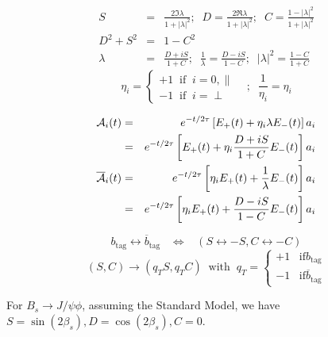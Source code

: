 \documentclass[a4paper,9pt,twoside]{article}
\begin{document}
\begin{eqnarray}
   S &=& \frac{2 \Im \lambda}{1+|\lambda|^2};\;\; D = \frac{2 \Re \lambda}{1+|\lambda|^2};\;\; C = \frac{1-|\lambda|^2 }{1+|\lambda|^2}\\
   D^2+S^2 & = & 1 - C^2 \\
   \lambda & = & \frac{D+iS}{1+C};\;\; \frac{1}{\lambda}  =  \frac{D-iS}{1-C};\;\; |\lambda|^2 = \frac{ 1-C }{ 1+C }
\end{eqnarray}
\begin{equation}
  \eta_i = \left\{ \begin{array}{l} +1 \;\; \mathrm{if}\;\; i=0,\parallel  \\ -1\;\; \mathrm{if}\;\; i=\perp \end{array} \right. \;\;\;;\;\; \frac{1}{\eta_i}=\eta_i
\end{equation}

\begin{eqnarray}
   {\cal A}_i(t)            &=& e^{-t/2\tau} \left[ E_+(t) + \eta_i \lambda E_-(t)  \right] a_i  \\
                            &=&     e^{-t/2\tau} \left[ E_+(t) +\eta_i \frac{D+iS}{1+C} E_-(t)  \right] a_i  \\
   {\overline{\cal A}}_i(t) &=& e^{-t/2\tau} \left[ \eta_i E_+(t) + \frac{1}{\lambda} E_-(t)  \right] a_i    \\
                            &=&     e^{-t/2\tau} \left[\eta_i E_+(t) + \frac{D-iS}{1-C} E_-(t)  \right] a_i   
\end{eqnarray}

\begin{equation}
b_\mathrm{tag} \leftrightarrow \overline{b}_\mathrm{tag} \;\;\;\Leftrightarrow\;\;\;  ( S \leftrightarrow -S, C\leftrightarrow -C ) 
\end{equation}
\begin{equation}
(S,C) \rightarrow (q_T S, q_T C) \;\; \mathrm{with}\;\; q_T = \left\{\begin{array}{l} +1 \;\;\; \mathrm{if} b_\mathrm{tag} \\
                                                                                   -1 \;\;\; \mathrm{if} \overline{b}_\mathrm{tag}
\end{array} \right.
\end{equation}

For $B_s\rightarrow J/\psi\phi$, assuming the Standard Model,  we have $S=\sin(2\beta_s),D=\cos(2\beta_s),C=0$.
\end{document}
